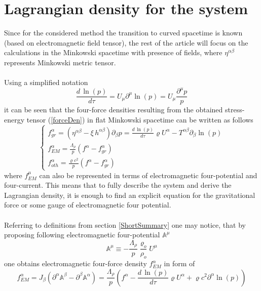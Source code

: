\documentclass[aps,prx,preprint,groupedaddress,showkeys]{revtex4-2}
\newcommand{\mds}[1] {\frac{d {#1}}{d\tau}}
\begin{document}
\section{Lagrangian density for the system} \label{SepOfFields}

Since for the considered method the transition to curved spacetime is known (based on electromagnetic field tensor), the rest of the article will focus on the calculations in the Minkowski spacetime with presence of fields, where $\eta^{\alpha \beta}$ represents Minkowski metric tensor. \\
~\\
Using a simplified notation
\begin{equation} \label{simplfNot}
\mds{\, \ln{(p)}} = U_{\mu} \partial^{\mu} \ln{(p)} = U_{\mu} \frac{\partial^{\mu} p}{p}
\end{equation}
it can be seen that the four-force densities resulting from the obtained stress-energy tensor (\ref{forceDen}) in flat Minkowski spacetime can be written as follows
\begin{equation} \label{forceDenNew}
\begin{cases} 
f^{\alpha}_{gr} = \left ( \eta^{\alpha \beta} - \xi \, h^{\alpha \beta}  \right ) \partial_{\beta} p = \mds{\,\ln{(p)}} \varrho U^{\alpha} - T^{\alpha \beta}  \partial_{\beta} \ln{(p)}  \\
f^{\alpha}_{EM} = \frac{\Lambda_{\rho}}{p} \left ( f^{\alpha} - f^{\alpha}_{gr} \right )\\
f^{\alpha}_{oth} = \frac{\varrho c^2}{p} \left ( f^{\alpha} - f^{\alpha}_{gr} \right )
\end{cases}
\end{equation}
where $f^{\mu}_{EM}$ can also be represented in terms of electromagnetic four-potential and four-current. This means that to fully describe the system and derive the Lagrangian density, it is enough to find an explicit equation for the gravitational force or some gauge of electromagnetic four potential.\\
~\\
Referring to definitions from section \ref{ShortSummary} one may notice, that by proposing following electromagnetic four-potential $\mathbb{A}^{\mu}$
\begin{equation} \label{EM4pot}
\mathbb{A}^{\mu} \equiv - \frac{\Lambda_{\rho}}{p} \frac{\varrho_o}{\rho_o} U^{\mu}
\end{equation}
one obtains electromagnetic four-force density $f^{\alpha}_{EM}$ in form of
\begin{equation} \label{EM4EMf}
f^{\alpha}_{EM} = J_{\beta} \left ( \partial^{\alpha}\mathbb{A}^{\beta} - \partial^{\beta}\mathbb{A}^{\alpha} \right ) = \frac{\Lambda_{\rho}}{p} \left ( f^{\alpha} - \mds{\,\ln{(p)}} \varrho U^{\alpha} + \varrho c^2 \partial^{\alpha} \ln{(p)}  \right )
\end{equation}
\end{document}
